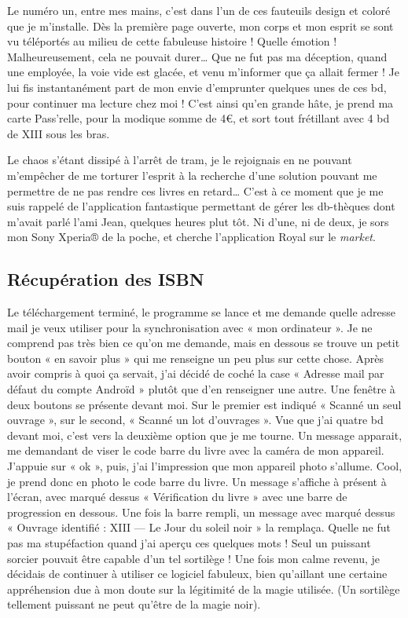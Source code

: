 Le numéro un, entre mes mains, c'est dans l'un de ces fauteuils design et coloré que je m'installe. 
Dès la première page ouverte, mon corps et mon esprit se sont vu téléportés au milieu de cette fabuleuse histoire !
Quelle émotion !
Malheureusement, cela ne pouvait durer… Que ne fut pas ma déception, quand une employée, la voie vide est glacée, et venu m'informer que ça allait fermer !
Je lui fis instantanément part de mon envie d'emprunter quelques unes de ces bd, pour continuer ma lecture chez moi !
C'est ainsi qu'en grande hâte, je prend ma carte Pass'relle, pour la modique somme de 4\euro{}, et sort tout frétillant avec 4 bd de XIII sous les bras. 

Le chaos s'étant dissipé à l'arrêt de tram, je le rejoignais en ne pouvant m'empêcher de me torturer l'esprit à la recherche d'une solution pouvant me permettre de ne pas rendre ces livres en retard…
C'est à ce moment que je me suis rappelé de l'application fantastique permettant de gérer les db-thèques dont m'avait parlé l'ami Jean, quelques heures plut tôt.
Ni d'une, ni de deux, je sors mon Sony Xperia® de la poche, et cherche l'application Royal sur le \emph{market}. 

\subsection{Récupération des ISBN}

Le téléchargement terminé, le programme se lance et me demande quelle adresse mail je veux utiliser pour la synchronisation avec « mon ordinateur ».
Je ne comprend pas très bien ce qu'on me demande, mais en dessous se trouve un petit bouton « en savoir plus » qui me renseigne un peu plus sur cette chose.
Après avoir compris à quoi ça servait, j'ai décidé de coché la case « Adresse mail par défaut du compte Androïd » plutôt que d'en renseigner une autre. 
Une fenêtre à deux boutons se présente devant moi.
Sur le premier est indiqué « Scanné un seul ouvrage », sur le second, « Scanné un lot d'ouvrages ». 
Vue que j'ai quatre bd devant moi, c'est vers la deuxième option que je me tourne. 
Un message apparait, me demandant de viser le code barre du livre avec la caméra de mon appareil. J'appuie sur « ok », puis, j'ai l'impression que mon appareil photo s'allume. 
Cool, je prend donc en photo le code barre du livre.
Un message s'affiche à présent à l'écran, avec marqué dessus « Vérification du livre » avec une barre de progression en dessous.
Une fois la barre rempli, un message avec marqué dessus « Ouvrage identifié : XIII — Le Jour du soleil noir » la remplaça.
Quelle ne fut pas ma stupéfaction quand j'ai aperçu ces quelques mots !
Seul un puissant sorcier pouvait être capable d'un tel sortilège !
Une fois mon calme revenu, je décidais de continuer à utiliser ce logiciel fabuleux, bien qu'aillant une certaine appréhension due à mon doute sur la légitimité de la magie utilisée. 
(Un sortilège tellement puissant ne peut qu'être de la magie noir).

